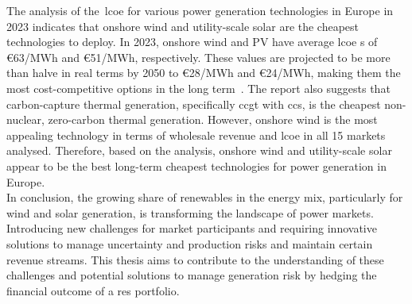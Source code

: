 
  The analysis of the~\gls{lcoe} for various power generation technologies in Europe in 2023
  indicates that onshore wind and utility-scale solar are the cheapest technologies to deploy.
  In 2023, onshore wind and PV have average \gls{lcoe} s of €63/MWh and €51/MWh, respectively.
  These values are projected to be more than halve in real terms by 2050 to €28/MWh and €24/MWh,
  making them the most cost-competitive options in the long term~\cite{abdullah_europe_2023}.
  The report also suggests that carbon-capture thermal generation,
  specifically \gls{ccgt} with \gls{ccs}, is the cheapest non-nuclear, zero-carbon thermal generation.
  However, onshore wind is the most appealing technology in terms of wholesale revenue and \gls{lcoe}
  in all 15 markets analysed.
  Therefore, based on the analysis, onshore wind and utility-scale solar appear to be the best
  long-term cheapest technologies for power generation in Europe.\\

  In conclusion, the growing share of renewables in the energy mix, particularly for wind and solar generation,
  is transforming the landscape of power markets.
  Introducing new challenges for market participants and requiring innovative solutions to manage uncertainty and
  production risks and maintain certain revenue streams.
  This thesis aims to contribute to the understanding of these challenges and potential solutions
  to manage generation risk by hedging the financial outcome of a \gls{res} portfolio.



